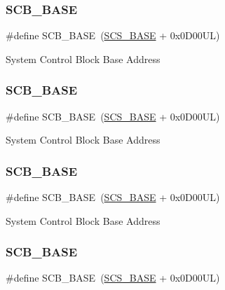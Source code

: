 \subsubsection{\texorpdfstring{SCB\_BASE}{SCB\_BASE}\hspace{0.1cm}{\footnotesize\ttfamily [2/12]}}
{\footnotesize\ttfamily \#define S\+C\+B\+\_\+\+B\+A\+SE~(\mbox{\hyperlink{group___c_m_s_i_s__core__base_ga3c14ed93192c8d9143322bbf77ebf770}{S\+C\+S\+\_\+\+B\+A\+SE}} +  0x0\+D00\+U\+L)}

System Control Block Base Address \mbox{\label{group___c_m_s_i_s__core__base_gad55a7ddb8d4b2398b0c1cfec76c0d9fd}} 
\subsubsection{\texorpdfstring{SCB\_BASE}{SCB\_BASE}\hspace{0.1cm}{\footnotesize\ttfamily [3/12]}}
{\footnotesize\ttfamily \#define S\+C\+B\+\_\+\+B\+A\+SE~(\mbox{\hyperlink{group___c_m_s_i_s__core__base_ga3c14ed93192c8d9143322bbf77ebf770}{S\+C\+S\+\_\+\+B\+A\+SE}} +  0x0\+D00\+U\+L)}

System Control Block Base Address \mbox{\label{group___c_m_s_i_s__core__base_gad55a7ddb8d4b2398b0c1cfec76c0d9fd}} 
\subsubsection{\texorpdfstring{SCB\_BASE}{SCB\_BASE}\hspace{0.1cm}{\footnotesize\ttfamily [4/12]}}
{\footnotesize\ttfamily \#define S\+C\+B\+\_\+\+B\+A\+SE~(\mbox{\hyperlink{group___c_m_s_i_s__core__base_ga3c14ed93192c8d9143322bbf77ebf770}{S\+C\+S\+\_\+\+B\+A\+SE}} +  0x0\+D00\+U\+L)}

System Control Block Base Address \mbox{\label{group___c_m_s_i_s__core__base_gad55a7ddb8d4b2398b0c1cfec76c0d9fd}} 
\subsubsection{\texorpdfstring{SCB\_BASE}{SCB\_BASE}\hspace{0.1cm}{\footnotesize\ttfamily [5/12]}}
{\footnotesize\ttfamily \#define S\+C\+B\+\_\+\+B\+A\+SE~(\mbox{\hyperlink{group___c_m_s_i_s__core__base_ga3c14ed93192c8d9143322bbf77ebf770}{S\+C\+S\+\_\+\+B\+A\+SE}} +  0x0\+D00\+U\+L)}

